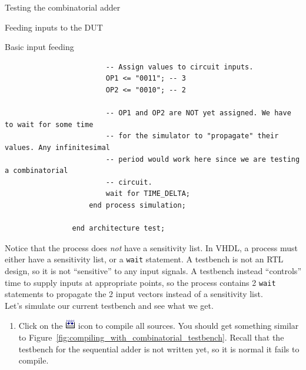\documentclass[a4paper, 12pt, onecolumn]{article}
\begin{document}
\begin{section}{Testing the combinatorial adder}
\begin{subsection}{Feeding inputs to the DUT}
\begin{subsubsection}{Basic input feeding}
\begin{verbatim}
                        -- Assign values to circuit inputs.
                        OP1 <= "0011"; -- 3
                        OP2 <= "0010"; -- 2

                        -- OP1 and OP2 are NOT yet assigned. We have to wait for some time
                        -- for the simulator to "propagate" their values. Any infinitesimal
                        -- period would work here since we are testing a combinatorial
                        -- circuit.
                        wait for TIME_DELTA;
                    end process simulation;

                end architecture test;
            \end{verbatim}
            \vspace{-1em}
        \end{subsubsection}

        Notice that the process does \emph{not} have a sensitivity list. In VHDL, a process must either have a sensitivity list, or a \texttt{wait} statement. A testbench is not an RTL design, so it is not ``sensitive'' to any input signals. A testbench instead ``controls'' time to supply inputs at appropriate points, so the process contains 2 \texttt{wait} statements to propagate the 2 input vectors instead of a sensitivity list. \\

        Let's simulate our current testbench and see what we get.

        \begin{enumerate}
            \item Click on the \includegraphics[height=12pt]{figs/compile_all_icon.png} icon to compile all sources. You should get something similar to Figure~\ref{fig:compiling_with_combinatorial_testbench}. Recall that the testbench for the sequential adder is not written yet, so it is normal it fails to compile.


\end{enumerate}
\end{subsection}
\end{section}
\end{document}
